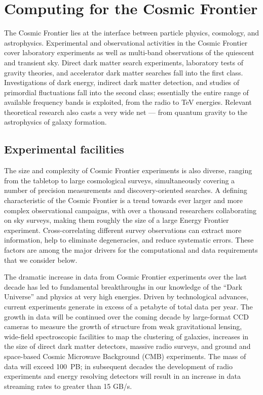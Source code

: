 
\section{Computing for the Cosmic Frontier}

The Cosmic Frontier lies at the interface between particle physics,
cosmology, and astrophysics. Experimental and observational activities
in the Cosmic Frontier cover laboratory experiments as well as
multi-band observations of the quiescent and transient sky. Direct
dark matter search experiments, laboratory tests of gravity theories,
and accelerator dark matter searches fall into the first
class. Investigations of dark energy, indirect dark matter detection,
and studies of primordial fluctuations fall into the second class;
essentially the entire range of available frequency bands is
exploited, from the radio to TeV energies. Relevant theoretical
research also casts a very wide net --- from quantum gravity to the
astrophysics of galaxy formation.

\subsection{Experimental facilities}
The size and complexity of Cosmic Frontier experiments is also
diverse, ranging from the tabletop to large cosmological surveys,
simultaneously covering a number of precision measurements and
discovery-oriented searches. A defining characteristic of the Cosmic
Frontier is a trend towards ever larger and more complex observational
campaigns, with over a thousand researchers collaborating on sky
surveys, making them roughly the size of a large Energy Frontier
experiment. Cross-correlating different survey observations can
extract more information, help to eliminate degeneracies, and reduce
systematic errors. These factors are among the major drivers for the
computational and data requirements that we consider below.

The dramatic increase in data from Cosmic Frontier experiments over
the last decade has led to fundamental breakthroughs in our knowledge
of the ``Dark Universe'' and physics at very high energies. Driven by
technological advances, current experiments generate in excess of a
petabyte  of total data per year. The growth in data will be
continued over the coming decade by large-format CCD cameras to
measure the growth of structure from weak gravitational lensing,
wide-field spectroscopic facilities to map the clustering of galaxies,
increases in the size of direct dark matter detectors, massive radio
surveys, and ground and space-based Cosmic Microwave Background (CMB)
experiments. The mass of data will exceed 100~PB; in subsequent decades
the development of radio experiments and energy resolving detectors
will result in an increase in data streaming rates to greater than 15 GB/s.

